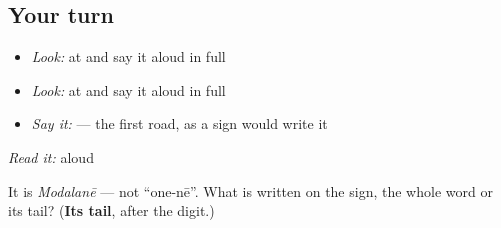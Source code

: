 \subsection*{Your turn}
\begin{itemize}
\raggedright
  \item \emph{Look:} at \textbf{} and say it aloud in full
  \item \emph{Look:} at \textbf{} and say it aloud in full
  \item \emph{Say it:} \textbf{ } — the first road, as a sign would write it
\end{itemize}

\begin{tcolorbox}[breakable,colback=teal!4,colframe=teal!35!black,title={Before you move on}]
\emph{Read it:} \textbf{} aloud

It is \emph{Modalanē} — not \textquotedblleft{}one-nē\textquotedblright{}. What is written on the sign, the whole word or its tail? (\textbf{Its tail}, after the digit.)
\end{tcolorbox}

